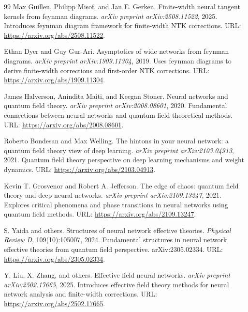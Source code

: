 \documentclass[a4paper]{article}
\theoremstyle{plain}
\theoremstyle{definition}
\theoremstyle{remark}
\begin{document}
\begin{thebibliography}{99}
\label{ref:guillen_misof_gerken_2025}
Max Guillen, Philipp Misof, and Jan E. Gerken.
Finite-width neural tangent kernels from feynman diagrams.
\textit{arXiv preprint arXiv:2508.11522}, 2025.
Introduces feynman diagram framework for finite-width NTK corrections.
URL: \href{https://arxiv.org/abs/2508.11522}{\url{https://arxiv.org/abs/2508.11522}}.

\label{ref:dyer_gur_ari_2019}
Ethan Dyer and Guy Gur-Ari.
Asymptotics of wide networks from feynman diagrams.
\textit{arXiv preprint arXiv:1909.11304}, 2019.
Uses feynman diagrams to derive finite-width corrections and first-order NTK corrections.
URL: \href{https://arxiv.org/abs/1909.11304}{\url{https://arxiv.org/abs/1909.11304}}.

\label{ref:halverson2020neural}
James Halverson, Anindita Maiti, and Keegan Stoner.
Neural networks and quantum field theory.
\textit{arXiv preprint arXiv:2008.08601}, 2020.
Fundamental connections between neural networks and quantum field theoretical methods.
URL: \href{https://arxiv.org/abs/2008.08601}{\url{https://arxiv.org/abs/2008.08601}}.

\label{ref:bondesan2021hintons}
Roberto Bondesan and Max Welling.
The hintons in your neural network: a quantum field theory view of deep learning.
\textit{arXiv preprint arXiv:2103.04913}, 2021.
Quantum field theory perspective on deep learning mechanisms and weight dynamics.
URL: \href{https://arxiv.org/abs/2103.04913}{\url{https://arxiv.org/abs/2103.04913}}.

\label{ref:grosvenor2021edge}
Kevin T. Grosvenor and Robert A. Jefferson.
The edge of chaos: quantum field theory and deep neural networks.
\textit{arXiv preprint arXiv:2109.13247}, 2021.
Explores critical phenomena and phase transitions in neural networks using quantum field methods.
URL: \href{https://arxiv.org/abs/2109.13247}{\url{https://arxiv.org/abs/2109.13247}}.

\label{ref:yaida2023structures}
S. Yaida and others.
Structures of neural network effective theories.
\textit{Physical Review D}, 109(10):105007, 2024.
Fundamental structures in neural network effective theories from quantum field perspective.
arXiv:2305.02334.
URL: \href{https://arxiv.org/abs/2305.02334}{\url{https://arxiv.org/abs/2305.02334}}.

\label{ref:liu2025efnn}
Y. Liu, X. Zhang, and others.
Effective field neural networks.
\textit{arXiv preprint arXiv:2502.17665}, 2025.
Introduces effective field theory methods for neural network analysis and finite-width corrections.
URL: \href{https://arxiv.org/abs/2502.17665}{\url{https://arxiv.org/abs/2502.17665}}.


\end{thebibliography}
\end{document}
